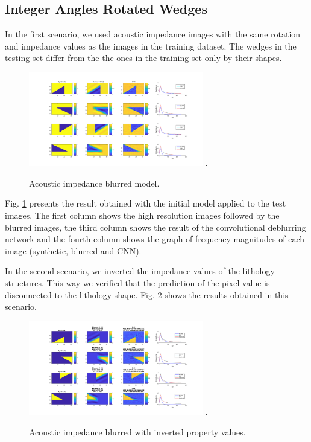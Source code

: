 \documentclass[conference,compsoc]{IEEEtran}
\begin{document}
\subsection{Integer Angles Rotated Wedges}

In the first scenario, we used acoustic impedance images
with the same rotation and impedance values as the images in the
training dataset. The wedges in the testing set differ from
the the ones in the training set only by their shapes.
\begin{figure}[!t]
\centering
\includegraphics[width=3.0in]{Figs/Caso1}
\DeclareGraphicsExtensions.
\caption{Acoustic impedance blurred model.}
\label{fig_scenario1}
\end{figure}
Fig. \ref{fig_scenario1} presents the result obtained with the initial model applied to the
test images. The first column shows the high resolution images followed
by the blurred images, the third column shows the result of the convolutional deblurring network
and the fourth column shows the graph of frequency magnitudes of each image
(synthetic, blurred and CNN).

In the second scenario, we inverted the impedance values of the lithology structures.
This way we verified that the prediction of the pixel value is disconnected to the lithology shape.
Fig. \ref{fig_scenario6} shows the results obtained in this scenario.
\begin{figure}[!t]
\centering
\includegraphics[width=3.0in]{Figs/Caso6}
\DeclareGraphicsExtensions.
\caption{Acoustic impedance blurred with inverted property values.}
\label{fig_scenario6}
\end{figure}
\end{document}
